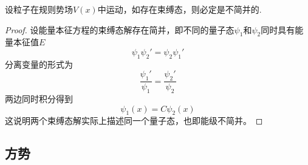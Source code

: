 \begin{theorem}\label{定理7}
    设粒子在规则势场$V(x)$中运动，如存在束缚态，则必定是不简并的.
\end{theorem}
\begin{proof}
    设能量本征方程的束缚态解存在简并，即不同的量子态$\psi_1$和$\psi_2$同时具有能量本征值$E$
    $$
        \psi_1\psi_2'=\psi_2\psi_1'
    $$
    分离变量的形式为
    $$
        \frac{\psi_1'}{\psi_1} = \frac{\psi_2'}{\psi_2}
    $$
    两边同时积分得到
    $$
        \psi_1(x)=C\psi_2(x)
    $$
    这说明两个束缚态解实际上描述同一个量子态，也即能级不简并。
\end{proof}





\subsection{方势}

